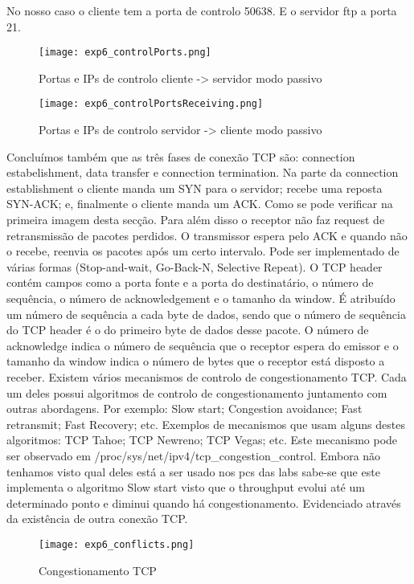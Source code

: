 \documentclass[a4paper]{article}
\begin{document}
No nosso caso o cliente tem a porta de controlo 50638. E o servidor ftp a porta 21.

\begin{figure}[h]
    \centering
    \texttt{[image: exp6\_controlPorts.png]}
    \caption{Portas e IPs de controlo cliente -> servidor modo passivo}
\end{figure}

\begin{figure}[h]
    \centering
    \texttt{[image: exp6\_controlPortsReceiving.png]}
    \caption{Portas e IPs de controlo servidor -> cliente modo passivo}
\end{figure}

Concluímos também que as três fases de conexão TCP são: connection
estabelishment, data transfer e connection termination. Na parte da connection
establishment o cliente manda um SYN para o servidor; recebe uma reposta
SYN-ACK; e, finalmente o cliente manda um ACK. Como se pode verificar na
primeira imagem desta secção. Para além disso o receptor não faz request de
retransmissão de pacotes perdidos. O transmissor espera pelo ACK e quando não o
recebe, reenvia os pacotes após um certo intervalo. Pode ser implementado de
várias formas (Stop-and-wait, Go-Back-N, Selective Repeat). O TCP header contém
campos como a porta fonte e a porta do destinatário, o número de sequência, o
número de acknowledgement e o tamanho da window. É atribuído um número de
sequência a cada byte de dados, sendo que o número de sequência do TCP header é
o do primeiro byte de dados desse pacote. O número de acknowledge indica o
número de sequência que o receptor espera do emissor e o tamanho da window
indica o número de bytes que o receptor está disposto a receber. Existem vários
mecanismos de controlo de congestionamento TCP. Cada um deles possui algoritmos
de controlo de congestionamento juntamento com outras abordagens. Por exemplo:
Slow start; Congestion avoidance; Fast retransmit; Fast Recovery; etc. Exemplos
de mecanismos que usam alguns destes algoritmos: TCP Tahoe; TCP Newreno; TCP
Vegas; etc. Este mecanismo pode ser observado em
/proc/sys/net/ipv4/tcp\_congestion\_control. Embora não tenhamos visto qual
deles está a ser usado nos pcs das labs sabe-se que este implementa o algoritmo
Slow start visto que o throughput evolui até um determinado ponto e diminui
quando há congestionamento. Evidenciado através da existência de outra conexão
TCP.

\begin{figure}[h]
    \centering
    \texttt{[image: exp6\_conflicts.png]}
    \caption{Congestionamento TCP}
\end{figure}
\end{document}
